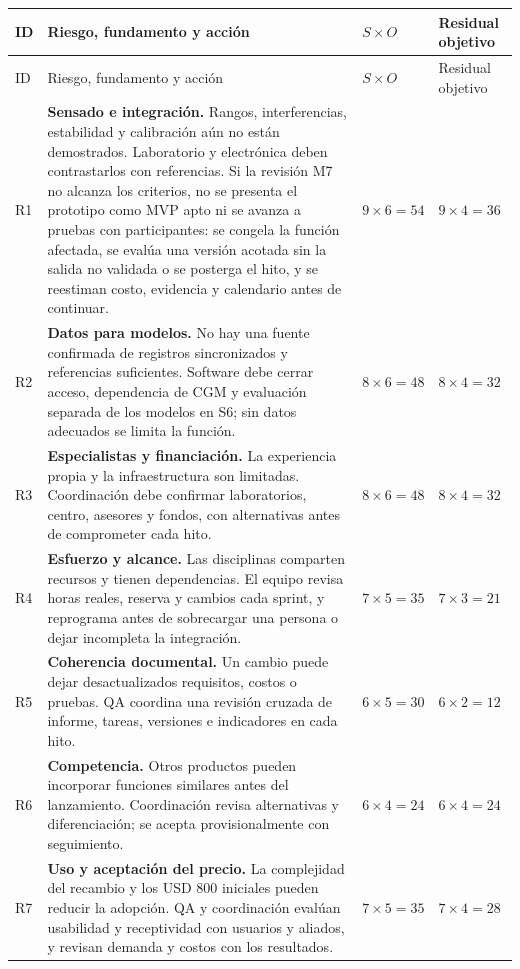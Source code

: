 {\small\renewcommand{\arraystretch}{1.2}
\begin{xltabular}{\linewidth}{l X l l}\toprule
ID & Riesgo, fundamento y acción & $S\times O$ & Residual objetivo\\\midrule
\endfirsthead
\toprule ID & Riesgo, fundamento y acción & $S\times O$ & Residual objetivo\\\midrule\endhead
R1 & \textbf{Sensado e integración.} Rangos, interferencias, estabilidad y calibración aún no están demostrados. Laboratorio y electrónica deben contrastarlos con referencias. Si la revisión M7 no alcanza los criterios, no se presenta el prototipo como MVP apto ni se avanza a pruebas con participantes: se congela la función afectada, se evalúa una versión acotada sin la salida no validada o se posterga el hito, y se reestiman costo, evidencia y calendario antes de continuar. & $9\times6=54$ & $9\times4=36$\\
R2 & \textbf{Datos para modelos.} No hay una fuente confirmada de registros sincronizados y referencias suficientes. Software debe cerrar acceso, dependencia de CGM y evaluación separada de los modelos en S6; sin datos adecuados se limita la función. & $8\times6=48$ & $8\times4=32$\\
R3 & \textbf{Especialistas y financiación.} La experiencia propia y la infraestructura son limitadas. Coordinación debe confirmar laboratorios, centro, asesores y fondos, con alternativas antes de comprometer cada hito. & $8\times6=48$ & $8\times4=32$\\
R4 & \textbf{Esfuerzo y alcance.} Las disciplinas comparten recursos y tienen dependencias. El equipo revisa horas reales, reserva y cambios cada sprint, y reprograma antes de sobrecargar una persona o dejar incompleta la integración. & $7\times5=35$ & $7\times3=21$\\
R5 & \textbf{Coherencia documental.} Un cambio puede dejar desactualizados requisitos, costos o pruebas. QA coordina una revisión cruzada de informe, tareas, versiones e indicadores en cada hito. & $6\times5=30$ & $6\times2=12$\\
R6 & \textbf{Competencia.} Otros productos pueden incorporar funciones similares antes del lanzamiento. Coordinación revisa alternativas y diferenciación; se acepta provisionalmente con seguimiento. & $6\times4=24$ & $6\times4=24$\\
R7 & \textbf{Uso y aceptación del precio.} La complejidad del recambio y los USD 800 iniciales pueden reducir la adopción. QA y coordinación evalúan usabilidad y receptividad con usuarios y aliados, y revisan demanda y costos con los resultados. & $7\times5=35$ & $7\times4=28$\\

\end{xltabular}}
